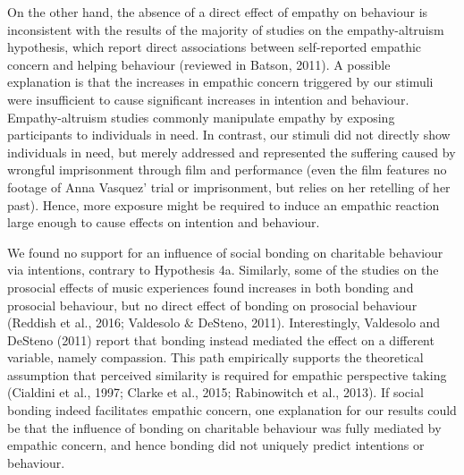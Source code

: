 \documentclass[
  man,floatsintext]{apa6}
\begin{document}
On the other hand, the absence of a direct effect of empathy on behaviour is inconsistent with the results of the majority of studies on the empathy-altruism hypothesis, which report direct associations between self-reported empathic concern and helping behaviour (reviewed in Batson, 2011). A possible explanation is that the increases in empathic concern triggered by our stimuli were insufficient to cause significant increases in intention and behaviour. Empathy-altruism studies commonly manipulate empathy by exposing participants to individuals in need. In contrast, our stimuli did not directly show individuals in need, but merely addressed and represented the suffering caused by wrongful imprisonment through film and performance (even the film features no footage of Anna Vasquez' trial or imprisonment, but relies on her retelling of her past). Hence, more exposure might be required to induce an empathic reaction large enough to cause effects on intention and behaviour.

We found no support for an influence of social bonding on charitable behaviour via intentions, contrary to Hypothesis 4a. Similarly, some of the studies on the prosocial effects of music experiences found increases in both bonding and prosocial behaviour, but no direct effect of bonding on prosocial behaviour (Reddish et al., 2016; Valdesolo \& DeSteno, 2011). Interestingly, Valdesolo and DeSteno (2011) report that bonding instead mediated the effect on a different variable, namely compassion. This path empirically supports the theoretical assumption that perceived similarity is required for empathic perspective taking (Cialdini et al., 1997; Clarke et al., 2015; Rabinowitch et al., 2013). If social bonding indeed facilitates empathic concern, one explanation for our results could be that the influence of bonding on charitable behaviour was fully mediated by empathic concern, and hence bonding did not uniquely predict intentions or behaviour.
\end{document}

